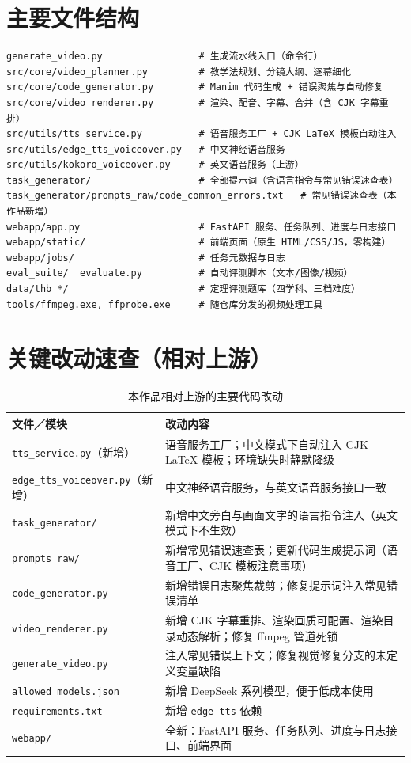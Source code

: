 \documentclass[11pt,a4paper]{ctexart}
\begin{document}
\appendix
\section{主要文件结构}

\begin{lstlisting}
generate_video.py                 # 生成流水线入口（命令行）
src/core/video_planner.py         # 教学法规划、分镜大纲、逐幕细化
src/core/code_generator.py        # Manim 代码生成 + 错误聚焦与自动修复
src/core/video_renderer.py        # 渲染、配音、字幕、合并（含 CJK 字幕重排）
src/utils/tts_service.py          # 语音服务工厂 + CJK LaTeX 模板自动注入
src/utils/edge_tts_voiceover.py   # 中文神经语音服务
src/utils/kokoro_voiceover.py     # 英文语音服务（上游）
task_generator/                   # 全部提示词（含语言指令与常见错误速查表）
task_generator/prompts_raw/code_common_errors.txt   # 常见错误速查表（本作品新增）
webapp/app.py                     # FastAPI 服务、任务队列、进度与日志接口
webapp/static/                    # 前端页面（原生 HTML/CSS/JS，零构建）
webapp/jobs/                      # 任务元数据与日志
eval_suite/  evaluate.py          # 自动评测脚本（文本/图像/视频）
data/thb_*/                       # 定理评测题库（四学科、三档难度）
tools/ffmpeg.exe, ffprobe.exe     # 随仓库分发的视频处理工具
\end{lstlisting}

\section{关键改动速查（相对上游）}

\begin{table}[htbp]
\centering
\small
\caption{本作品相对上游的主要代码改动}
\begin{tabularx}{\textwidth}{@{}p{4.6cm} X@{}}
\toprule
\textbf{文件／模块} & \textbf{改动内容} \\
\midrule
\texttt{tts\_service.py}（新增） & 语音服务工厂；中文模式下自动注入 CJK LaTeX 模板；环境缺失时静默降级 \\
\texttt{edge\_tts\_voiceover.py}（新增） & 中文神经语音服务，与英文语音服务接口一致 \\
\texttt{task\_generator/} & 新增中文旁白与画面文字的语言指令注入（英文模式下不生效） \\
\texttt{prompts\_raw/} & 新增常见错误速查表；更新代码生成提示词（语音工厂、CJK 模板注意事项） \\
\texttt{code\_generator.py} & 新增错误日志聚焦裁剪；修复提示词注入常见错误清单 \\
\texttt{video\_renderer.py} & 新增 CJK 字幕重排、渲染画质可配置、渲染目录动态解析；修复 ffmpeg 管道死锁 \\
\texttt{generate\_video.py} & 注入常见错误上下文；修复视觉修复分支的未定义变量缺陷 \\
\texttt{allowed\_models.json} & 新增 DeepSeek 系列模型，便于低成本使用 \\
\texttt{requirements.txt} & 新增 \texttt{edge-tts} 依赖 \\
\texttt{webapp/} & 全新：FastAPI 服务、任务队列、进度与日志接口、前端界面 \\
\bottomrule
\end{tabularx}
\end{table}
\end{document}
